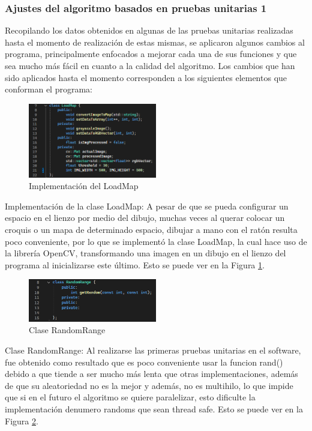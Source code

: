 \subsubsection{Ajustes del algoritmo basados en pruebas unitarias 1}
    Recopilando los datos obtenidos en algunas de las pruebas
        unitarias realizadas hasta el momento de realizaci\'on de estas
        mismas, se aplicaron algunos cambios al programa,
        principalmente enfocados a mejorar cada una de sus
        funciones y que sea mucho m\'as f\'acil en cuanto a la calidad
        del algoritmo.
        \vskip 0.5cm
    Los cambios que han sido aplicados hasta el momento
        corresponden a los siguientes elementos que conforman el
        programa:
        \vskip 0.5cm
    \begin{figure}[htbp]
        \centering
        \includegraphics[width=0.5\textwidth]{./images/Pruebas/simulador/image045.png}
        \caption{Implementaci\'on del LoadMap}
        \label{fig:Pruebaunitaria2}
    \end{figure}
    Implementaci\'on de la clase LoadMap: A pesar de que se
        pueda configurar un espacio en el lienzo por medio del
        dibujo, muchas veces al querar colocar un croquis o un mapa
        de determinado espacio, dibujar a mano con el rat\'on resulta
        poco conveniente, por lo que se implement\'o la clase
        LoadMap, la cual hace uso de la librer\'ia OpenCV,
        transformando una imagen en un dibujo en el lienzo del
        programa al inicializarse este \'ultimo. Esto se puede ver en
        la Figura \ref{fig:Pruebaunitaria2}.
        \vskip 0.5cm
    \begin{figure}[htbp]
        \centering
        \includegraphics[width=0.5\textwidth]{./images/Pruebas/simulador/image046.png}
        \caption{Clase RandomRange}
        \label{fig:Pruebaunitaria3}
    \end{figure}
    Clase RandomRange: Al realizarse las primeras pruebas
        unitarias en el software, fue obtenido como resultado que es
        poco conveniente usar la funcion rand() debido a que tiende
        a ser mucho m\'as lenta que otras implementaciones, adem\'as
        de que su aleatoriedad no es la mejor y adem\'as, no es
        multihilo, lo que impide que si en el futuro el algoritmo se
        quiere paralelizar, esto dificulte la implementaci\'on denumero randoms que sean thread safe. Esto se puede ver en
        la Figura \ref{fig:Pruebaunitaria3}.
        \vskip 0.5cm
